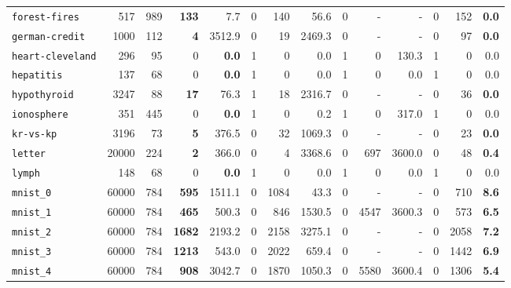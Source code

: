 \begin{tabular}{lccrrrrrrrrrrr}
\texttt{forest-fires} & \multicolumn{1}{r}{517} & \multicolumn{1}{r}{989}  & \textbf{133} & 7.7 & 0 & 140 & 56.6 & 0 & - & - & 0 & 152 & \textbf{0.0}\\
\texttt{german-credit} & \multicolumn{1}{r}{1000} & \multicolumn{1}{r}{112}  & \textbf{4} & 3512.9 & 0 & 19 & 2469.3 & 0 & - & - & 0 & 97 & \textbf{0.0}\\
\texttt{heart-cleveland} & \multicolumn{1}{r}{296} & \multicolumn{1}{r}{95}  & 0 & \textbf{0.0} & 1 & 0 & 0.0 & 1 & 0 & 130.3 & 1 & 0 & 0.0\\
\texttt{hepatitis} & \multicolumn{1}{r}{137} & \multicolumn{1}{r}{68}  & 0 & \textbf{0.0} & 1 & 0 & 0.0 & 1 & 0 & 0.0 & 1 & 0 & 0.0\\
\texttt{hypothyroid} & \multicolumn{1}{r}{3247} & \multicolumn{1}{r}{88}  & \textbf{17} & 76.3 & 1 & 18 & 2316.7 & 0 & - & - & 0 & 36 & \textbf{0.0}\\
\texttt{ionosphere} & \multicolumn{1}{r}{351} & \multicolumn{1}{r}{445}  & 0 & \textbf{0.0} & 1 & 0 & 0.2 & 1 & 0 & 317.0 & 1 & 0 & 0.0\\
\texttt{kr-vs-kp} & \multicolumn{1}{r}{3196} & \multicolumn{1}{r}{73}  & \textbf{5} & 376.5 & 0 & 32 & 1069.3 & 0 & - & - & 0 & 23 & \textbf{0.0}\\
\texttt{letter} & \multicolumn{1}{r}{20000} & \multicolumn{1}{r}{224}  & \textbf{2} & 366.0 & 0 & 4 & 3368.6 & 0 & 697 & 3600.0 & 0 & 48 & \textbf{0.4}\\
\texttt{lymph} & \multicolumn{1}{r}{148} & \multicolumn{1}{r}{68}  & 0 & \textbf{0.0} & 1 & 0 & 0.0 & 1 & 0 & 0.0 & 1 & 0 & 0.0\\
\texttt{mnist\_0} & \multicolumn{1}{r}{60000} & \multicolumn{1}{r}{784}  & \textbf{595} & 1511.1 & 0 & 1084 & 43.3 & 0 & - & - & 0 & 710 & \textbf{8.6}\\
\texttt{mnist\_1} & \multicolumn{1}{r}{60000} & \multicolumn{1}{r}{784}  & \textbf{465} & 500.3 & 0 & 846 & 1530.5 & 0 & 4547 & 3600.3 & 0 & 573 & \textbf{6.5}\\
\texttt{mnist\_2} & \multicolumn{1}{r}{60000} & \multicolumn{1}{r}{784}  & \textbf{1682} & 2193.2 & 0 & 2158 & 3275.1 & 0 & - & - & 0 & 2058 & \textbf{7.2}\\
\texttt{mnist\_3} & \multicolumn{1}{r}{60000} & \multicolumn{1}{r}{784}  & \textbf{1213} & 543.0 & 0 & 2022 & 659.4 & 0 & - & - & 0 & 1442 & \textbf{6.9}\\
\texttt{mnist\_4} & \multicolumn{1}{r}{60000} & \multicolumn{1}{r}{784}  & \textbf{908} & 3042.7 & 0 & 1870 & 1050.3 & 0 & 5580 & 3600.4 & 0 & 1306 & \textbf{5.4}\\

\end{tabular}
